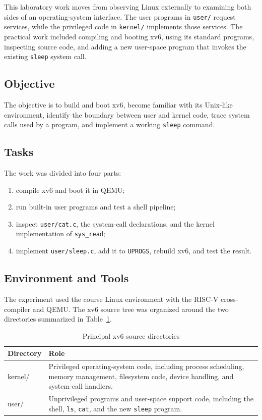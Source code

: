\documentclass[12pt]{article}
\newcommand{\commandname}[1]{\texttt{#1}}
\begin{document}
This laboratory work moves from observing Linux externally to examining both sides of an operating-system interface. The user programs in \commandname{user/} request services, while the privileged code in \commandname{kernel/} implements those services. The practical work included compiling and booting xv6, using its standard programs, inspecting source code, and adding a new user-space program that invokes the existing \commandname{sleep} system call.

\subsection{Objective}

The objective is to build and boot xv6, become familiar with its Unix-like environment, identify the boundary between user and kernel code, trace system calls used by a program, and implement a working \commandname{sleep} command.

\subsection{Tasks}

The work was divided into four parts:

\begin{enumerate}
    \item compile xv6 and boot it in QEMU;
    \item run built-in user programs and test a shell pipeline;
    \item inspect \commandname{user/cat.c}, the system-call declarations, and the kernel implementation of \commandname{sys\_read};
    \item implement \commandname{user/sleep.c}, add it to \commandname{UPROGS}, rebuild xv6, and test the result.
\end{enumerate}

\subsection{Environment and Tools}

The experiment used the course Linux environment with the RISC-V cross-compiler and QEMU. The xv6 source tree was organized around the two directories summarized in Table~\ref{tab:tree}.

\begin{table}[H]
    \centering
    \caption{Principal xv6 source directories}
    \label{tab:tree}
    \begin{tabular}{>{\ttfamily}p{} p{}}
        \toprule
        \normalfont\textbf{Directory} & \textbf{Role} \\
        \midrule
        kernel/ & Privileged operating-system code, including process scheduling, memory management, filesystem code, device handling, and system-call handlers. \\
        user/ & Unprivileged programs and user-space support code, including the shell, \commandname{ls}, \commandname{cat}, and the new \commandname{sleep} program. \\
        \bottomrule
    \end{tabular}
\end{table}
\end{document}
